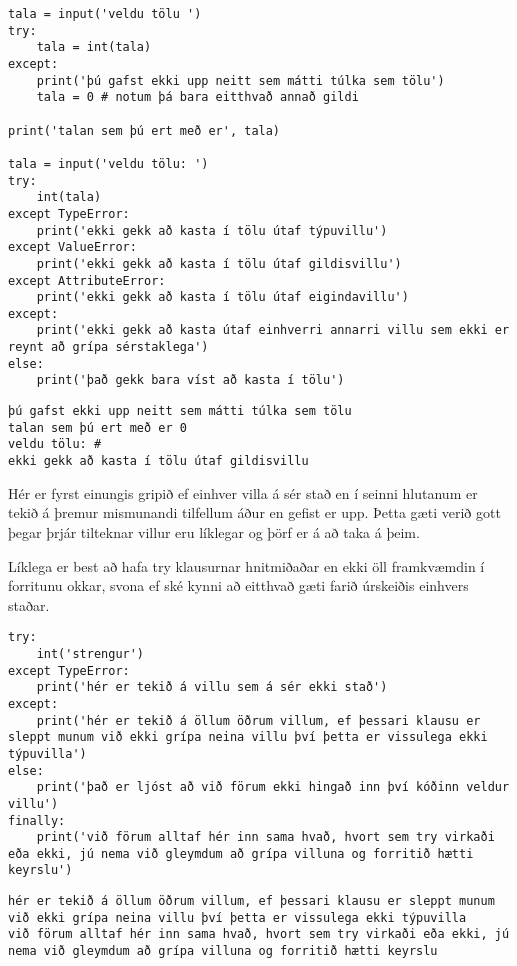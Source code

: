 \begin{lstlisting}[caption=Hvernig á að beita try - except - else, label=lst:villur-grip-kynnt]
tala = input('veldu tölu ')
try:
	tala = int(tala)
except:
	print('þú gafst ekki upp neitt sem mátti túlka sem tölu')
	tala = 0 # notum þá bara eitthvað annað gildi
	
print('talan sem þú ert með er', tala)

tala = input('veldu tölu: ')
try:
	int(tala)
except TypeError:
	print('ekki gekk að kasta í tölu útaf týpuvillu')
except ValueError:
	print('ekki gekk að kasta í tölu útaf gildisvillu')
except AttributeError:
	print('ekki gekk að kasta í tölu útaf eigindavillu')
except:
	print('ekki gekk að kasta útaf einhverri annarri villu sem ekki er reynt að grípa sérstaklega')
else:
	print('það gekk bara víst að kasta í tölu')
\end{lstlisting}
\lstset{style=uttak}
\begin{lstlisting}
þú gafst ekki upp neitt sem mátti túlka sem tölu
talan sem þú ert með er 0
veldu tölu: #
ekki gekk að kasta í tölu útaf gildisvillu
\end{lstlisting}
\lstset{style=venjulegt}

Hér er fyrst einungis gripið ef einhver villa á sér stað en í seinni hlutanum er tekið á þremur mismunandi tilfellum áður en gefist er upp.
Þetta gæti verið gott þegar þrjár tilteknar villur eru líklegar og þörf er á að taka á þeim.

Líklega er best að hafa try klausurnar hnitmiðaðar en ekki öll framkvæmdin í forritunu okkar, svona ef ské kynni að eitthvað gæti farið úrskeiðis einhvers staðar.


\begin{lstlisting}[caption=Hvernig á að beita try - except - else, label=lst:villur-grip-kynnt-2]
try:
	int('strengur')
except TypeError:
	print('hér er tekið á villu sem á sér ekki stað')
except:
	print('hér er tekið á öllum öðrum villum, ef þessari klausu er sleppt munum við ekki grípa neina villu því þetta er vissulega ekki týpuvilla')
else:
	print('það er ljóst að við förum ekki hingað inn því kóðinn veldur villu')
finally:
	print('við förum alltaf hér inn sama hvað, hvort sem try virkaði eða ekki, jú nema við gleymdum að grípa villuna og forritið hætti keyrslu')
\end{lstlisting}
\lstset{style=uttak}
\begin{lstlisting}
hér er tekið á öllum öðrum villum, ef þessari klausu er sleppt munum við ekki grípa neina villu því þetta er vissulega ekki týpuvilla
við förum alltaf hér inn sama hvað, hvort sem try virkaði eða ekki, jú nema við gleymdum að grípa villuna og forritið hætti keyrslu
\end{lstlisting}
\lstset{style=venjulegt}



